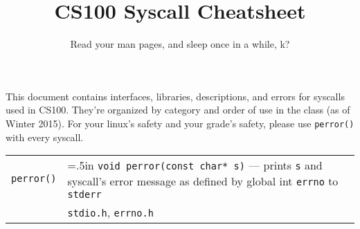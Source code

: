 \documentclass{article}
\title{CS100 Syscall Cheatsheet}
\author{Read your man pages, and sleep once in a while, k?}
\date{}
\newcommand{\indenth}[1][.5]{\hangindent=#1in
                         \hangafter=1 }
\begin{document}
\maketitle

\large This document contains interfaces, libraries, descriptions, and errors for 
syscalls used in CS100. They're organized by category and order of use in the class (as of Winter 2015). For your linux's safety and 
your grade's safety, please use \texttt{perror()} with every syscall. 

\medskip
\begin{tabu} {p{1in}|p{5.7in}}
\texttt{perror()} & \indenth\texttt{void perror(const char* s)} --- prints \texttt{s} and syscall's error message as defined by global int \texttt{errno} to \texttt{stderr}
    \\
& \texttt{stdio.h}, \texttt{errno.h}
\end{tabu}
\normalsize
\end{document}
